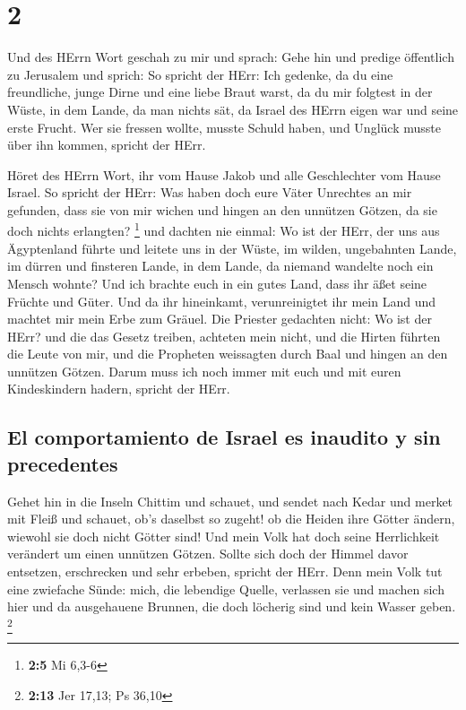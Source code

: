 \hypertarget{section-1}{%
\section{2}\label{section-1}}

 Und des HErrn Wort geschah zu mir und sprach:
 Gehe hin und predige öffentlich zu Jerusalem und sprich:
So spricht der HErr: Ich gedenke, da du eine freundliche, junge Dirne
und eine liebe Braut warst, da du mir folgtest in der Wüste, in dem
Lande, da man nichts sät,  da Israel des HErrn eigen war
und seine erste Frucht. Wer sie fressen wollte, musste Schuld haben, und
Unglück musste über ihn kommen, spricht der HErr.

 Höret des HErrn Wort, ihr vom Hause Jakob und alle
Geschlechter vom Hause Israel.  So spricht der HErr: Was
haben doch eure Väter Unrechtes an mir gefunden, dass sie von mir wichen
und hingen an den unnützen Götzen, da sie doch nichts erlangten?
\footnote{\textbf{2:5} Mi 6,3-6}  und dachten nie einmal:
Wo ist der HErr, der uns aus Ägyptenland führte und leitete uns in der
Wüste, im wilden, ungebahnten Lande, im dürren und finsteren Lande, in
dem Lande, da niemand wandelte noch ein Mensch wohnte? 
Und ich brachte euch in ein gutes Land, dass ihr äßet seine Früchte und
Güter. Und da ihr hineinkamt, verunreinigtet ihr mein Land und machtet
mir mein Erbe zum Gräuel.  Die Priester gedachten nicht:
Wo ist der HErr? und die das Gesetz treiben, achteten mein nicht, und
die Hirten führten die Leute von mir, und die Propheten weissagten durch
Baal und hingen an den unnützen Götzen.  Darum muss ich
noch immer mit euch und mit euren Kindeskindern hadern, spricht der
HErr.

\hypertarget{el-comportamiento-de-israel-es-inaudito-y-sin-precedentes}{%
\subsection{El comportamiento de Israel es inaudito y sin
precedentes}\label{el-comportamiento-de-israel-es-inaudito-y-sin-precedentes}}

 Gehet hin in die Inseln Chittim und schauet, und sendet
nach Kedar und merket mit Fleiß und schauet, ob's daselbst so zugeht!
 ob die Heiden ihre Götter ändern, wiewohl sie doch nicht
Götter sind! Und mein Volk hat doch seine Herrlichkeit verändert um
einen unnützen Götzen.  Sollte sich doch der Himmel davor
entsetzen, erschrecken und sehr erbeben, spricht der HErr.
 Denn mein Volk tut eine zwiefache Sünde: mich, die
lebendige Quelle, verlassen sie und machen sich hier und da ausgehauene
Brunnen, die doch löcherig sind und kein Wasser geben. \footnote{\textbf{2:13}
  Jer 17,13; Ps 36,10}

